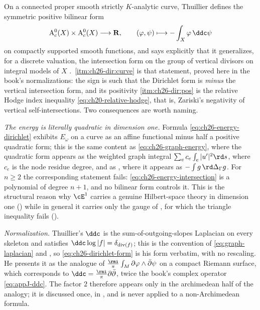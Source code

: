 \begin{remark}[Thuillier's Dirichlet form, and what \(n=1\) buys]
\label{rem:ch26-thuillier-dirichlet}
On a connected proper smooth strictly \(K\)-analytic curve, Thuillier defines
the symmetric positive bilinear form
\[
 \mathrm A^0_c(X)\times \mathrm A^0_c(X)\longrightarrow\mathbf R,
 \qquad
 (\varphi,\psi)\longmapsto-\int_X\varphi\,\ddc\psi
\]
on compactly supported smooth functions, and says explicitly that it
generalizes, for a discrete valuation, the intersection form on the group of
vertical divisors on integral models of \(X\) \cite[\S3.5]{Thu05}.
\,\cref{itm:ch26-dir:curve} is that
statement, proved here in the book's normalizations: the sign is such that
the Dirichlet form is \emph{minus} the vertical intersection form, and its
positivity \cref{itm:ch26-dir:pos} is the relative Hodge index inequality
\eqref{eq:ch20-relative-hodge}, that is, Zariski's negativity of vertical
self-intersections.  Two consequences are worth naming.

\emph{The energy is literally quadratic in dimension one.}
Formula \eqref{eq:ch26-energy-dirichlet} exhibits \(E_\omega\) on a curve as
an affine functional minus half a positive quadratic form; this is the same
content as \eqref{eq:ch26-graph-energy}, where the quadratic form appears as
the weighted graph integral \(\sum_e c_e\int_e|u'|^2\rd s\), where
\(c_e\) is the node residue degree, and as
, where it appears as
\(-\int g\,\rd\Delta_\Gamma g\).  For \(n\geq2\) the corresponding statement
fails: \eqref{eq:ch26-energy-intersection} is a polynomial of degree
\(n+1\), and no bilinear form controls it.  This is the structural reason
why \(\cE^1\) carries a genuine Hilbert-space theory in dimension one
() while in general it carries only the gauge of
, for which the triangle inequality fails
().

\emph{Normalization.}  Thuillier's \(\ddc\) is the sum-of-outgoing-slopes
Laplacian on every skeleton and satisfies
\(\ddc\log|f|=\delta_{\operatorname{div}(f)}\); this is the convention of
\eqref{eq:graph-laplacian} and , so
\eqref{eq:ch26-dirichlet-form} is his form verbatim, with no rescaling.  He
presents it as the analogue of
\(\frac{\rmi}{\pi}\int_M\partial\varphi\wedge\bar\partial\psi\) on a compact
Riemann surface, which corresponds to
\(\ddc=\frac{\rmi}{\pi}\partial\bar\partial\), twice the book's complex
operator \eqref{eq:appJ-ddc}.  The factor \(2\) therefore appears only in
the archimedean half of the analogy; it is discussed once, in
, and is never applied to a
non-Archimedean formula.
\end{remark}

